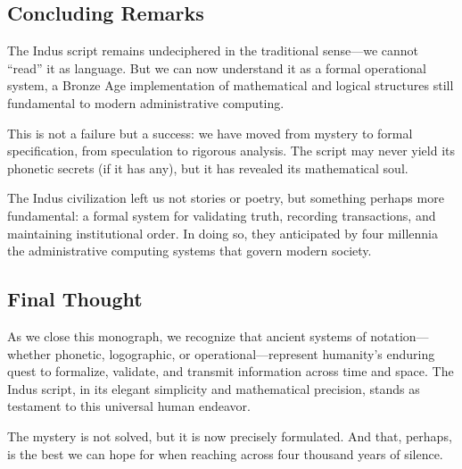 \subsection{Concluding Remarks}

The Indus script remains undeciphered in the traditional sense—we cannot ``read'' it as language. But we can now understand it as a formal operational system, a Bronze Age implementation of mathematical and logical structures still fundamental to modern administrative computing.

This is not a failure but a success: we have moved from mystery to formal specification, from speculation to rigorous analysis. The script may never yield its phonetic secrets (if it has any), but it has revealed its mathematical soul.

The Indus civilization left us not stories or poetry, but something perhaps more fundamental: a formal system for validating truth, recording transactions, and maintaining institutional order. In doing so, they anticipated by four millennia the administrative computing systems that govern modern society.

\subsection{Final Thought}

As we close this monograph, we recognize that ancient systems of notation—whether phonetic, logographic, or operational—represent humanity's enduring quest to formalize, validate, and transmit information across time and space. The Indus script, in its elegant simplicity and mathematical precision, stands as testament to this universal human endeavor.

The mystery is not solved, but it is now precisely formulated. And that, perhaps, is the best we can hope for when reaching across four thousand years of silence.
